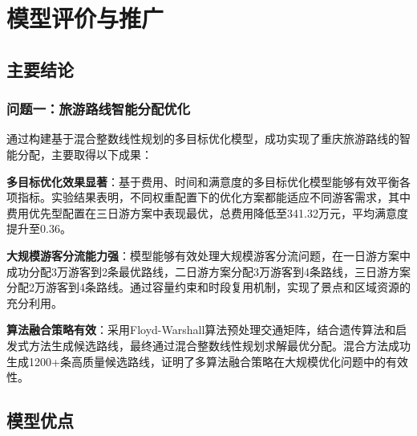 \chapter[\hspace{0pt}模型评价与推广]{{\heiti{}\hspace{0pt}模型评价与推广}}\label{chapter4: 模型评价与推广}
\removelofgap
\removelotgap

\section[\hspace{-2pt}主要结论]{{\heiti{} \hspace{-8pt}主要结论}}\label{section5: 主要结论}

\subsection[\hspace{-2pt}问题一：旅游路线智能分配优化]{{\heiti{} \hspace{-8pt}问题一：旅游路线智能分配优化}}\label{subsection5: 问题一评价}

通过构建基于混合整数线性规划的多目标优化模型，成功实现了重庆旅游路线的智能分配，主要取得以下成果：

\noindent\textbf{多目标优化效果显著}：基于费用、时间和满意度的多目标优化模型能够有效平衡各项指标。实验结果表明，不同权重配置下的优化方案都能适应不同游客需求，其中费用优先型配置在三日游方案中表现最优，总费用降低至341.32万元，平均满意度提升至0.36。

\noindent\textbf{大规模游客分流能力强}：模型能够有效处理大规模游客分流问题，在一日游方案中成功分配3万游客到2条最优路线，二日游方案分配3万游客到4条路线，三日游方案分配2万游客到4条路线。通过容量约束和时段复用机制，实现了景点和区域资源的充分利用。

\noindent\textbf{算法融合策略有效}：采用Floyd-Warshall算法预处理交通矩阵，结合遗传算法和启发式方法生成候选路线，最终通过混合整数线性规划求解最优分配。混合方法成功生成1200+条高质量候选路线，证明了多算法融合策略在大规模优化问题中的有效性。

\section[\hspace{-2pt}模型优点]{{\heiti{} \hspace{-8pt}模型优点}}\label{section5: 模型优点}

